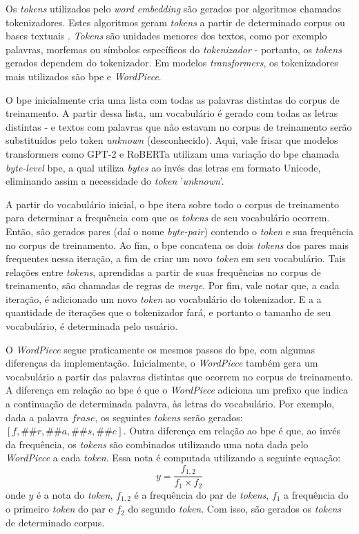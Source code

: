 Os \textit{tokens} utilizados pelo \textit{word embedding} são gerados por algoritmos chamados tokenizadores. Estes algoritmos geram \textit{tokens} a partir de determinado corpus ou bases textuais \cite{Mielke2021BetweenWA}. \textit{Tokens} são unidades menores dos textos, como por exemplo palavras, morfemas ou símbolos específicos do \textit{tokenizador} - portanto, os \textit{tokens} gerados dependem do tokenizador. Em modelos \textit{transformers}, os tokenizadores mais utilizados são \gls{bpe} e \textit{WordPiece}.

O \gls{bpe} inicialmente cria uma lista com todas as palavras distintas do corpus de treinamento. A partir dessa lista, um vocabulário é gerado com todas as letras distintas - e textos com palavras que não estavam no corpus de treinamento serão substituídos pelo token \textit{unknown} (desconhecido). Aqui, vale frisar que modelos transformers como GPT-2 e RoBERTa utilizam uma variação do \gls{bpe} chamada \textit{byte-level} \gls{bpe}, a qual utiliza \textit{bytes} ao invés das letras em formato Unicode, eliminando assim a necessidade do \textit{token} '\textit{unknown}'.

A partir do vocabulário inicial, o \gls{bpe} itera sobre todo o corpus de treinamento para determinar a frequência com que os \textit{tokens} de seu vocabulário ocorrem. Então, são gerados pares (daí o nome \textit{byte-pair}) contendo o \textit{token} e sua frequência no corpus de treinamento. Ao fim, o \gls{bpe} concatena os dois \textit{tokens} dos pares mais frequentes nessa iteração, a fim de criar um novo \textit{token} em seu vocabulário. Tais relações entre \textit{tokens}, aprendidas a partir de suas frequências no corpus de treinamento, são chamadas de regras de \textit{merge}. Por fim, vale notar que, a cada iteração, é adicionado um novo \textit{token} ao vocabulário do tokenizador. E a a quantidade de iterações que o tokenizador fará, e portanto o tamanho de seu vocabulário, é determinada pelo usuário.

O \textit{WordPiece} segue praticamente os mesmos passos do \gls{bpe}, com algumas diferenças da implementação. Inicialmente, o \textit{WordPiece} também gera um vocabulário a partir das palavras distintas que ocorrem no corpus de treinamento. A diferença em relação ao \gls{bpe} é que o \textit{WordPiece} adiciona um prefixo que indica a continuação de determinada palavra, às letras do vocabulário. Por exemplo, dada a palavra $frase$, os seguintes \textit{tokens} serão gerados: $[f, \#\#r, \#\#a, \#\#s, \#\#e]$. Outra diferença em relação ao \gls{bpe} é que, ao invés da frequência, os \textit{tokens} são combinados utilizando uma nota dada pelo \textit{WordPiece} a cada \textit{token}. Essa nota é computada utilizando a seguinte equação:
\begin{equation*}
y=\frac{f_{1,2}}{f_1 \times f_2}
\end{equation*}
onde $y$ é a nota do \textit{token}, $f_{1,2}$ é a frequência do par de \textit{tokens}, $f_1$ a frequência do o primeiro \textit{token} do par e $f_2$ do segundo \textit{token}. Com isso, são gerados os \textit{tokens} de determinado corpus.

